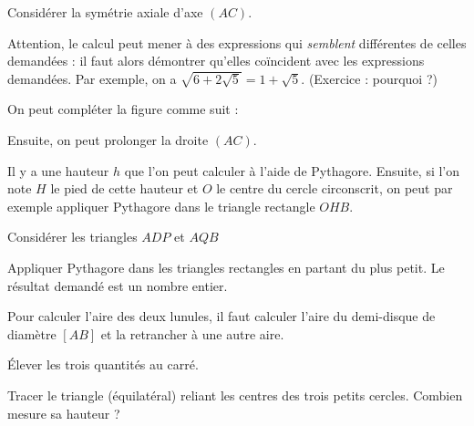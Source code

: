 \begin{Hint}{2}
Considérer la symétrie axiale d'axe $(AC)$.
\end{Hint}
\begin{Hint}{3}
Attention, le calcul peut mener à des expressions qui \emph{semblent} différentes de celles demandées : il faut alors démontrer qu'elles coïncident avec les expressions demandées. Par exemple, on a $\sqrt{6+2\sqrt 5} = 1+\sqrt 5$. (Exercice : pourquoi ?)
\end{Hint}
\begin{Hint}{5}
On peut compléter la figure comme suit :
\begin{center}
\end{center}
Ensuite, on peut prolonger la droite $(AC)$.
\end{Hint}
\begin{Hint}{8}
Il y a une hauteur $h$ que l'on peut calculer à l'aide de Pythagore.
Ensuite, si l'on note $H$ le pied de cette hauteur et $O$ le centre du cercle circonscrit, on peut par exemple appliquer Pythagore dans le triangle rectangle $OHB$.
\end{Hint}
\begin{Hint}{11}
Considérer les triangles $ADP$ et $AQB$
\end{Hint}
\begin{Hint}{13}
Appliquer Pythagore dans les triangles rectangles en partant du plus petit. Le résultat demandé est un nombre entier.
\end{Hint}
\begin{Hint}{14}
Pour calculer l'aire des deux lunules, il faut calculer l'aire du demi-disque de diamètre $[AB]$ et la retrancher à une autre aire.
\end{Hint}
\begin{Hint}{20}
Élever les trois quantités au carré.
\end{Hint}
\begin{Hint}{21}
Tracer le triangle (équilatéral) reliant les centres des trois petits cercles. Combien mesure  sa hauteur ?
\end{Hint}
